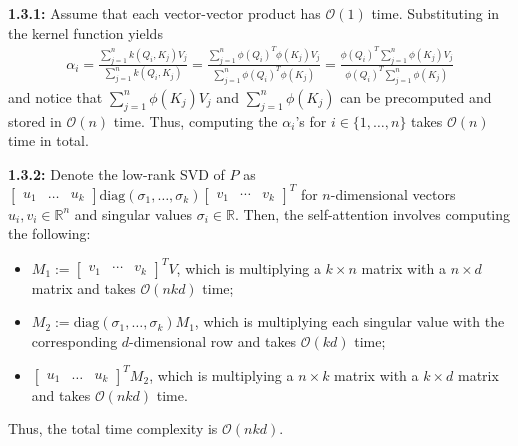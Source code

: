 \documentclass[12pt]{article}
\begin{document}
\textbf{1.3.1:} Assume that each vector-vector product has $\mathcal{O}(1)$ time. Substituting in the kernel function yields \begin{align*}
    \alpha_i = \frac{\sum_{j=1}^n k(Q_i,K_j)V_j}{\sum_{j=1}^n k(Q_i,K_j)} = \frac{\sum_{j=1}^n \phi(Q_i)^T \phi(K_j)V_j}{\sum_{j=1}^n \phi(Q_i)^T \phi(K_j)} = \frac{\phi(Q_i)^T \sum_{j=1}^n \phi(K_j)V_j}{\phi(Q_i)^T \sum_{j=1}^n \phi(K_j)}
\end{align*} and notice that $\sum_{j=1}^n \phi(K_j)V_j$ and $\sum_{j=1}^n \phi(K_j)$ can be precomputed and stored in $\mathcal{O}(n)$ time. Thus, computing the $\alpha_i$'s for $i\in\{1,\ldots,n\}$ takes $\mathcal{O}(n)$ time in total.

\textbf{1.3.2:} Denote the low-rank SVD of $P$ as $\begin{bmatrix} u_1 & \ldots & u_k \end{bmatrix} \text{diag}(\sigma_1, \ldots, \sigma_k) \begin{bmatrix} v_1 & \cdots & v_k \end{bmatrix}^T$ for $n$-dimensional vectors $u_i, v_i \in \mathbb{R}^n$ and singular values $\sigma_i \in \mathbb{R}$. Then, the self-attention involves computing the following: \begin{itemize}
    \item $M_1 := \begin{bmatrix} v_1 & \cdots & v_k \end{bmatrix}^T V$, which is multiplying a $k\times n$ matrix with a $n\times d$ matrix and takes $\mathcal{O}(nkd)$ time;
    \item $M_2 := \text{diag}(\sigma_1, \ldots, \sigma_k) M_1$, which is multiplying each singular value with the corresponding $d$-dimensional row and takes $\mathcal{O}(kd)$ time;
    \item $\begin{bmatrix} u_1 & \ldots & u_k \end{bmatrix}^T M_2$, which is multiplying a $n\times k$ matrix with a $k\times d$ matrix and takes $\mathcal{O}(nkd)$ time.
\end{itemize} Thus, the total time complexity is $\mathcal{O}(nkd)$.
\end{document}
